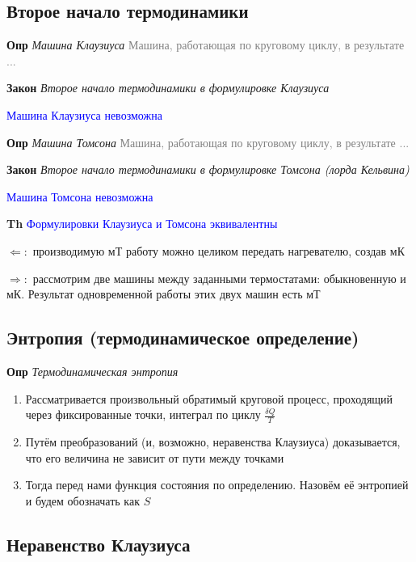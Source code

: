 \documentclass[a4paper, 14pt]{article}
\begin{document}
    \subsection{Второе начало термодинамики}
    
    \textbf{Опр} \textit{Машина Клаузиуса} \textcolor{gray}{Машина, работающая по круговому циклу, в результате ...}
    
    \textbf{Закон} \textit{Второе начало термодинамики в формулировке Клаузиуса}
    
    \textcolor{blue}{Машина Клаузиуса невозможна}
    
    \textbf{Опр} \textit{Машина Томсона} \textcolor{gray}{Машина, работающая по круговому циклу, в результате ...}
    
    \textbf{Закон} \textit{Второе начало термодинамики в формулировке Томсона (лорда Кельвина)}
    
    \textcolor{blue}{Машина Томсона невозможна}
    
    \textbf{Th} \textcolor{blue}{Формулировки Клаузиуса и Томсона эквивалентны}
    
    $\Leftarrow:$ производимую мТ работу можно целиком передать нагревателю, создав мК
    
    $\Rightarrow:$ рассмотрим две машины между заданными термостатами: обыкновенную и мК.
    Результат одновременной работы этих двух машин есть мТ
    
    \subsection{Энтропия (термодинамическое определение)}
    
    \textbf{Опр} \textit{Термодинамическая энтропия}
    
    \begin{enumerate}
        \item Рассматривается произвольный обратимый круговой процесс, проходящий через фиксированные точки, интеграл
        по циклу $\frac{\delta Q}{T}$
        \item Путём преобразований (и, возможно, неравенства Клаузиуса) доказывается, что его величина не зависит от
        пути между точками
        \item Тогда перед нами функция состояния по определению.
        Назовём её энтропией и будем обозначать как $S$
    \end{enumerate}
    
    \subsection{Неравенство Клаузиуса}
    
\end{document}
